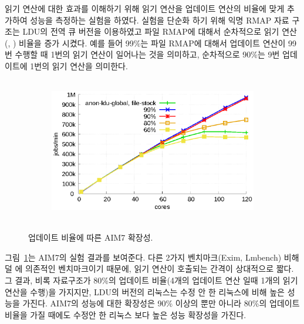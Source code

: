 읽기 연산에 대한 효과를 이해하기 위해 읽기 연산을 업데이트 연산의 비율에 
맞게 추가하여 성능을 측정하는 실험을 하였다.
실험을 단순화 하기 위해 익명 RMAP 자료 구조는 LDU의 전역 큐 버전을 이용하였고 
파일 RMAP에 대해서 순차적으로 읽기 연산(, ) 비율을 증가 시켰다.
예를 들어 99\%는 파일 RMAP에 대해서 업데이트 연산이 99번 수행할 때 1번의 읽기 연산이 
일어나는 것을 의미하고, 순차적으로 90\%는 9번 업데이트에 1번의 읽기 연산을 의미한다.

\begin{figure}[h!]
    \centering
    \begin{subfigure}[b]{1\textwidth}
        \includegraphics[height=2.5in]{graph/ratio_aim7_core.eps}
    \end{subfigure}%
    \caption{업데이트 비율에 따른 AIM7 확장성.}
    \label{fig:UpdateRate_aim7_2}
\end{figure}
 
 
그림~\ref{fig:UpdateRate_aim7_2}는 AIM7의 실험 결과를 보여준다.
다른 2가지 벤치마크(Exim, Lmbench) 비해 덜 에 의존적인 벤치마크이기 때문에, 
읽기 연산이 호출되는 간격이 상대적으로 짧다.
그 결과, 비록 자료구조가 80\%의 업데이트 비율(4개의 업데이트 연산 일때 1개의 읽기 연산을 수행)을 
가지지만, LDU의 버전의 리눅스는 수정 안 한 리눅스에 비해 높은 성능을 가진다. 
AIM7의 성능에 대한 확장성은 90\% 이상의 뿐만 아니라 80\%의 업데이트 비율을 가질 때에도 수정안 한 
리눅스 보다 높은 성능 확장성을 가진다.
 
